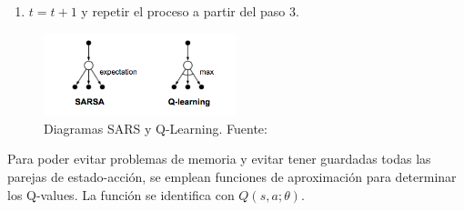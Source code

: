 \begin{itemize}
\begin{enumerate}
        \item $t = t + 1$ y repetir el proceso a partir del paso 3. 
    \end{enumerate} 
    \begin{figure}[h]
    \centering
    \includegraphics[width=0.5\textwidth]{cap2_contextualizacion/images/sarsa_vs_q_learning.png}
    \caption{Diagramas SARS y Q-Learning. Fuente: \cite{lilLogRL}}
    \label{fig:sarsa_vs_q_learning}
    \end{figure}
    Para poder evitar problemas de memoria y evitar tener guardadas todas las parejas de estado-acción, se emplean funciones de aproximación para determinar los Q-values. La función se identifica con $Q(s, a; \theta)$. \\
    

\end{itemize}
